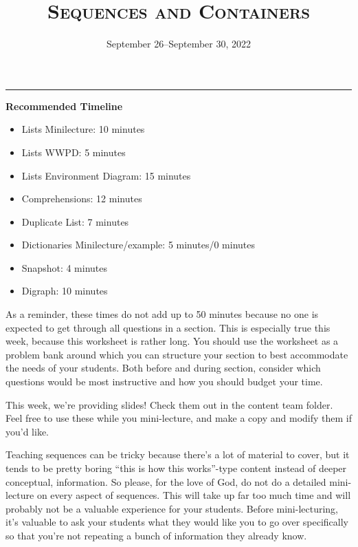 \documentclass{exam}
\title{\textsc{Sequences and Containers}}
\date{September 26--September 30, 2022}
\begin{document}
\maketitle
\rule{\textwidth}{0.15em}
\fontsize{12}{15}\selectfont


\begin{meta}
    \textbf{Recommended Timeline}
    \begin{itemize}
        \item Lists Minilecture: 10 minutes
        \item Lists WWPD: 5 minutes
        \item Lists Environment Diagram: 15 minutes
        \item Comprehensions: 12 minutes
        \item Duplicate List: 7 minutes
        \item Dictionaries Minilecture/example: 5 minutes/0 minutes
        \item Snapshot: 4 minutes
        \item Digraph: 10 minutes
    \end{itemize}

    As a reminder, these times do not add up to 50 minutes because no one is expected 
    to get through all questions in a section. This is especially true this week, 
    because this worksheet is rather long. You should use the worksheet as a problem bank
     around which you can structure your section to best accommodate the needs of your 
     students. Both before and during section, consider which questions would be most 
     instructive and how you should budget your time.

    This week, we're providing slides! Check them out in the content team folder. 
    Feel free to use these while you mini-lecture, and make a copy and modify them 
    if you'd like. 

    Teaching sequences can be tricky because there's a lot of material to cover, but 
    it tends to be pretty boring ``this is how this works''-type content instead of 
    deeper conceptual, information. So please, for the love of God, do not do a detailed 
    mini-lecture on every aspect of sequences. This will take up far too much time and 
    will probably not be a valuable experience for your students. Before mini-lecturing, 
    it's valuable to ask your students what they would like you to go over specifically 
    so that you're not repeating a bunch of information they already know. 
\end{meta}
\end{document}
